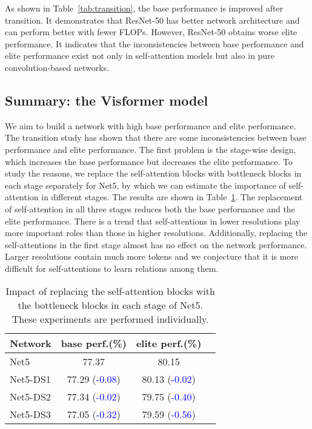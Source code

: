 \documentclass[10pt,twocolumn,letterpaper]{article}
\begin{document}
As shown in Table~\ref{tab:transition}, the base performance is improved after transition. It demonstrates that ResNet-50 has better network architecture and can perform better with fewer FLOPs. However, ResNet-50 obtains worse elite performance. It indicates that the inconsistencies between base performance and elite performance exist not only in self-attention models but also in pure convolution-based networks. 


\subsection{Summary: the Visformer model}
\label{methodology:visformer}

We aim to build a network with high base performance and elite performance. The transition study has shown that there are some inconsistencies between base performance and elite performance. The first problem is the stage-wise design, which increases the base performance but decreases the elite performance. To study the reasons, we replace the self-attention blocks with bottleneck blocks in each stage separately for Net5, by which we can estimate the importance of self-attention in different stages. The results are shown in Table~\ref{tab:self-attention-ablation}. The replacement of self-attention in all three stages reduces both the base performance and the elite performance. There is a trend that self-attentions in lower resolutions play more important roles than those in higher resolutions. Additionally, replacing the self-attentions in the first stage almost has no effect on the network performance. Larger resolutions contain much more tokens and we conjecture that it is more difficult for self-attentions to learn relations among them.

\begin{table}
\begin{center}
\begin{tabular}{|l|c|c|c|}
\hline
Network & base perf.(\%)& elite perf.(\%)\\
\hline\hline
Net5 & 77.37  & 80.15 \\
\hline
Net5-DS1  & 77.29 (\textcolor{blue}{-0.08}) & 80.13 (\textcolor{blue}{-0.02})\\
Net5-DS2 &77.34 (\textcolor{blue}{-0.02}) &79.75 (\textcolor{blue}{-0.40}) \\
Net5-DS3 &77.05 (\textcolor{blue}{-0.32}) &79.59 (\textcolor{blue}{-0.56})\\
\hline
\end{tabular}
\end{center}
\caption{Impact of replacing the self-attention blocks with the bottleneck blocks in each stage of Net5. These experiments are performed individually.}
\label{tab:self-attention-ablation}
\end{table}
\end{document}
